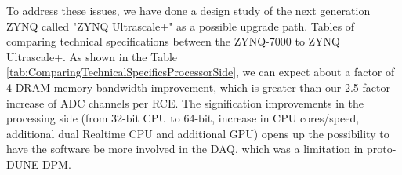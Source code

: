 To address these issues, we have done a design study of the next generation ZYNQ called "ZYNQ Ultrascale+" as a possible upgrade path. Tables of comparing technical specifications between the ZYNQ-7000 to ZYNQ Ultrascale+.   As shown in the Table \ref{tab:ComparingTechnicalSpecificsProcessorSide}, we can expect about a factor of 4 DRAM memory bandwidth improvement, which is greater than our 2.5 factor increase of ADC channels per RCE.  The signification improvements in the processing side (from 32-bit CPU to 64-bit, increase in CPU cores/speed, additional dual Realtime CPU and additional GPU) opens up the possibility to have the software be more involved in the DAQ, which was a limitation in proto-DUNE DPM.

\begin{table}[tb]
\centering
{}
\caption{Comparing Technical Specifications of the Processor Side}
\label{tab:ComparingTechnicalSpecificsProcessorSide}
\end{table}

